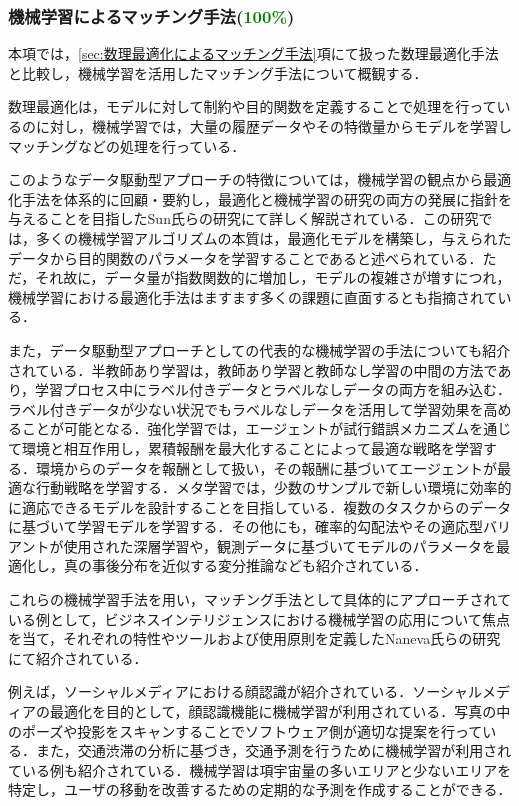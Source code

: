       \subsubsection{機械学習によるマッチング手法(\textcolor{green}{100\%})}
        \label{sec:機械学習によるマッチング手法}
          \par 本項では，\ref{sec:数理最適化によるマッチング手法}項にて扱った数理最適化手法と比較し，機械学習を活用したマッチング手法について概観する．
          \par 数理最適化は，モデルに対して制約や目的関数を定義することで処理を行っているのに対し，機械学習では，大量の履歴データやその特徴量からモデルを学習しマッチングなどの処理を行っている．
          \par このようなデータ駆動型アプローチの特徴については，機械学習の観点から最適化手法を体系的に回顧・要約し，最適化と機械学習の研究の両方の発展に指針を与えることを目指したSun氏らの研究にて詳しく解説されている．この研究では，多くの機械学習アルゴリズムの本質は，最適化モデルを構築し，与えられたデータから目的関数のパラメータを学習することであると述べられている．ただ，それ故に，データ量が指数関数的に増加し，モデルの複雑さが増すにつれ，機械学習における最適化手法はますます多くの課題に直面するとも指摘されている．
          \par また，データ駆動型アプローチとしての代表的な機械学習の手法についても紹介されている．半教師あり学習は，教師あり学習と教師なし学習の中間の方法であり，学習プロセス中にラベル付きデータとラベルなしデータの両方を組み込む．ラベル付きデータが少ない状況でもラベルなしデータを活用して学習効果を高めることが可能となる．強化学習では，エージェントが試行錯誤メカニズムを通じて環境と相互作用し，累積報酬を最大化することによって最適な戦略を学習する．環境からのデータを報酬として扱い，その報酬に基づいてエージェントが最適な行動戦略を学習する．メタ学習では，少数のサンプルで新しい環境に効率的に適応できるモデルを設計することを目指している．複数のタスクからのデータに基づいて学習モデルを学習する．その他にも，確率的勾配法やその適応型バリアントが使用された深層学習や，観測データに基づいてモデルのパラメータを最適化し，真の事後分布を近似する変分推論なども紹介されている．
          \par これらの機械学習手法を用い，マッチング手法として具体的にアプローチされている例として，ビジネスインテリジェンスにおける機械学習の応用について焦点を当て，それぞれの特性やツールおよび使用原則を定義したNaneva氏らの研究にて紹介されている．
          \par 例えば，ソーシャルメディアにおける顔認識が紹介されている．ソーシャルメディアの最適化を目的として，顔認識機能に機械学習が利用されている．写真の中のポーズや投影をスキャンすることでソフトウェア側が適切な提案を行っている．また，交通渋滞の分析に基づき，交通予測を行うために機械学習が利用されている例も紹介されている．機械学習は項宇宙量の多いエリアと少ないエリアを特定し，ユーザの移動を改善するための定期的な予測を作成することができる．
